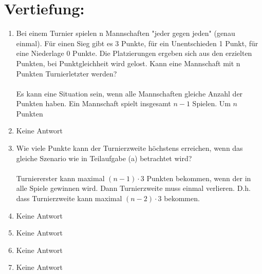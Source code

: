 


\DeclareMathOperator{\ggT}{ggT}
\DeclareMathOperator{\kgV}{kgV}


    \maketitle
    \section*{Vertiefung:}
    \begin{enumerate}[label=(\alph*)]
        \item Bei einem Turnier spielen n Mannschaften "jeder gegen jeden" (genau einmal). Für einen
		Sieg gibt es 3 Punkte, für ein Unentschieden 1 Punkt, für eine Niederlage 0 Punkte. Die
		Platzierungen ergeben sich aus den erzielten Punkten, bei Punktgleichheit wird gelost.
		Kann eine Mannschaft mit n Punkten Turnierletzter werden? \\\\
		Es kann eine Situation sein, wenn alle Mannschaften gleiche Anzahl der Punkten haben. 
		Ein Mannschaft spielt insgesamt $n-1$ Spielen. Um $n$ Punkten 
		
        \item Keine Antwort
        
        \item Wie viele Punkte kann der Turnierzweite höchstens erreichen, wenn das gleiche Szenario
		wie in Teilaufgabe (a) betrachtet wird? \\\\
		Turniererster kann maximal $(n-1)\cdot 3$ Punkten bekommen, wenn der in alle Spiele gewinnen 
		wird. Dann Turnierzweite muss einmal verlieren. D.h. dass Turnierzweite kann maximal 
		$(n-2)\cdot 3$ bekommen.
        
        \item Keine Antwort
        
        \item Keine Antwort
        
        \item Keine Antwort
        
        \item Keine Antwort
        

\end{enumerate}
